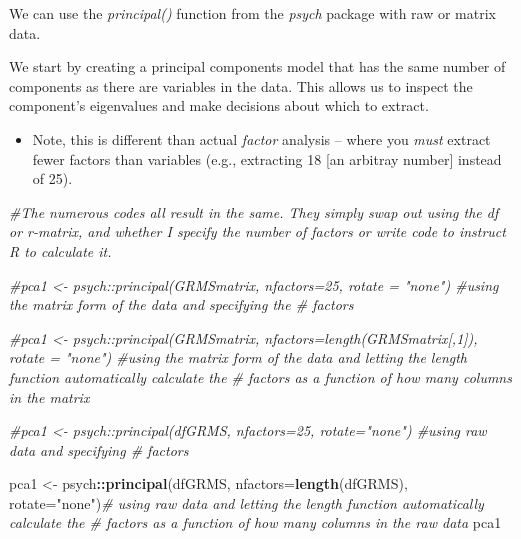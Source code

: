 \documentclass[
  english,
]{book}
\newenvironment{Shaded}{\begin{snugshade}}{\end{snugshade}}
\newcommand{\CommentTok}[1]{\textcolor[rgb]{0.56,0.35,0.01}{\textit{#1}}}
\newcommand{\DataTypeTok}[1]{\textcolor[rgb]{0.13,0.29,0.53}{#1}}
\newcommand{\KeywordTok}[1]{\textcolor[rgb]{0.13,0.29,0.53}{\textbf{#1}}}
\newcommand{\NormalTok}[1]{#1}
\newcommand{\OperatorTok}[1]{\textcolor[rgb]{0.81,0.36,0.00}{\textbf{#1}}}
\newcommand{\StringTok}[1]{\textcolor[rgb]{0.31,0.60,0.02}{#1}}
\providecommand{\tightlist}{%
  \setlength{\itemsep}{0pt}\setlength{\parskip}{0pt}}
\begin{document}
We can use the \emph{principal()} function from the \emph{psych} package with raw or matrix data.

We start by creating a principal components model that has the same number of components as there are variables in the data. This allows us to inspect the component's eigenvalues and make decisions about which to extract.

\begin{itemize}
\tightlist
\item
  Note, this is different than actual \emph{factor} analysis -- where you \emph{must} extract fewer factors than variables (e.g., extracting 18 {[}an arbitray number{]} instead of 25).
\end{itemize}

\begin{Shaded}
\begin{Highlighting}[]
\CommentTok{#The numerous codes all result in the same. They simply swap out using the df or r-matrix, and whether I specify the number of factors or write code to instruct R to calculate it.}

\CommentTok{#pca1 <- psych::principal(GRMSmatrix, nfactors=25, rotate = "none") #using the matrix form of the data and specifying the # factors}

\CommentTok{#pca1 <- psych::principal(GRMSmatrix, nfactors=length(GRMSmatrix[,1]), rotate = "none") #using the matrix form of the data and letting the length function automatically calculate the # factors as a function of how many columns in the matrix}

\CommentTok{#pca1 <- psych::principal(dfGRMS, nfactors=25, rotate="none") #using raw data and specifying # factors}

\NormalTok{pca1 <-}\StringTok{ }\NormalTok{psych}\OperatorTok{::}\KeywordTok{principal}\NormalTok{(dfGRMS, }\DataTypeTok{nfactors=}\KeywordTok{length}\NormalTok{(dfGRMS), }\DataTypeTok{rotate=}\StringTok{"none"}\NormalTok{)}\CommentTok{# using raw data and letting the length function automatically calculate the # factors as a function of how many columns in the raw data}
\NormalTok{pca1}
\end{Highlighting}
\end{Shaded}
\end{document}
